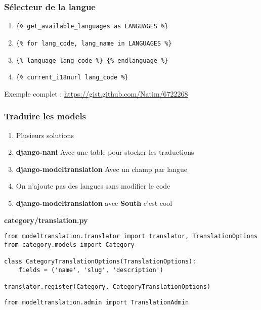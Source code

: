 \documentclass{beamer}
\begin{document}
\begin{frame}[fragile]
  \frametitle{Sélecteur de la langue}
  \begin{enumerate}
    \item \texttt{\{\% get\_available\_languages as LANGUAGES \%\}}
    \pause \item \texttt{\{\% for lang\_code, lang\_name in LANGUAGES \%\}}
    \pause \item \texttt{\{\% language lang\_code \%\} \{\% endlanguage \%\}}
    \pause \item \texttt{\{\% current\_i18nurl lang\_code \%\}}
  \end{enumerate}
\pause
\vfill
  Exemple complet : \url{https://gist.github.com/Natim/6722268}
\vfill
\end{frame}

\begin{frame}[fragile]
  \frametitle{Traduire les models}
  \begin{enumerate}
    \item Plusieurs solutions
    \pause \item \textbf{django-nani} Avec une table pour stocker les traductions
    \pause \item \textbf{django-modeltranslation} Avec un champ par langue
    \pause \item On n'ajoute pas des langues sans modifier le code
    \pause \item \textbf{django-modeltranslation} avec \textbf{South} c'est cool
  \end{enumerate}
\pause
\textbf{category/translation.py}
\begin{lstlisting}
from modeltranslation.translator import translator, TranslationOptions
from category.models import Category

class CategoryTranslationOptions(TranslationOptions):
    fields = ('name', 'slug', 'description')

translator.register(Category, CategoryTranslationOptions)
\end{lstlisting}
\pause
\texttt{from modeltranslation.admin import TranslationAdmin}
\end{frame}
\end{document}
